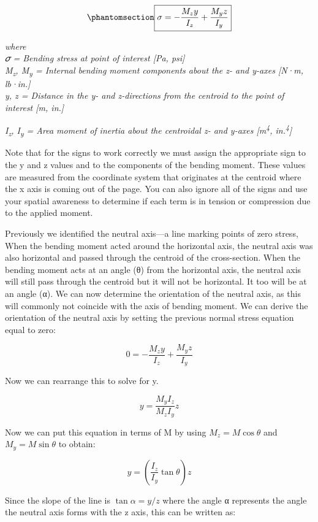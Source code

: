 \documentclass[
  letterpaper,
  DIV=11,
  numbers=noendperiod]{scrreprt}
\theoremstyle{definition}
\theoremstyle{remark}
\begin{document}
\begin{equation}\phantomsection\label{eq-9.5}{
\boxed{\sigma=-\frac{M_z y}{I_z}+\frac{M_y z}{I_y}}
}\end{equation}

\emph{where}\\
\emph{𝜎 = Bending stress at point of interest {[}Pa, psi{]}}\\
\emph{M\textsubscript{z}, M\textsubscript{y} = Internal bending moment
components about the z- and y-axes {[}N·m, lb·in.{]}}\\
\emph{y, z = Distance in the y- and z-directions from the centroid to
the point of interest {[}m, in.{]}}

\emph{I\textsubscript{z}, I\textsubscript{y} = Area moment of inertia
about the centroidal z- and y-axes {[}m\textsuperscript{4},
in.\textsuperscript{4}{]}}

Note that for the signs to work correctly we must assign the appropriate
sign to the y and z values and to the components of the bending moment.
These values are measured from the coordinate system that originates at
the centroid where the x axis is coming out of the page. You can also
ignore all of the signs and use your spatial awareness to determine if
each term is in tension or compression due to the applied moment.

Previously we identified the neutral axis---a line marking points of
zero stress, When the bending moment acted around the horizontal axis,
the neutral axis was also horizontal and passed through the centroid of
the cross-section. When the bending moment acts at an angle (θ) from the
horizontal axis, the neutral axis will still pass through the centroid
but it will not be horizontal. It too will be at an angle (α). We can
now determine the orientation of the neutral axis, as this will commonly
not coincide with the axis of bending moment. We can derive the
orientation of the neutral axis by setting the previous normal stress
equation equal to zero:

\[
0=-\frac{M_z y}{I_z}+\frac{M_y z}{I_y}
\]

Now we can rearrange this to solve for y.

\[
y=\frac{M_y I_z}{M_z I_y} z
\]

Now we can put this equation in terms of M by using
\(M_z=M \cos \theta\) and \(M_y=M \sin \theta\) to obtain:

\[
y=\left(\frac{I_z}{I_y} \tan \theta\right) z
\]

Since the slope of the line is \(\tan \alpha=y / z\) where the angle α
represents the angle the neutral axis forms with the z axis, this can be
written as:
\end{document}
